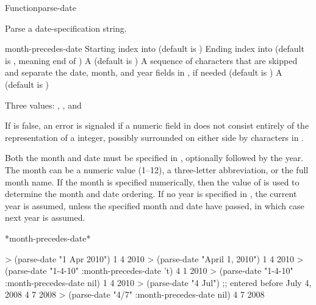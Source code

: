 \documentclass[10pt,twoside,english,pdftex]{article}
\begin{document}
\begin{functiondoc}{Function}{parse-date}{%
     
    \mbox{\returns{} }}
% 

\fnsyntax

\fnpurpose Parse a date-specification string.

\fnpackage {}

\fnmodule {}

\fnargs
\begin{args}{month-precedes-date}
\arg[start] Starting index into  (default is )
\arg[end] Ending index into  (default is \nil, meaning
end of )
 A  (default is \nil)
\arg[separators] A sequence of characters that are skipped and separate the
 date, month, and year fields in , if needed (default is 
 )
 A  (default is 
\textbf{})
\end{args}

\fnreturns Three values: , , and 

\fnerrors
%
If  is false, an error is signaled if a numeric field in
 does not consist entirely of the representation of a integer,
possibly surrounded on either side by characters in .

\fndescription
%
Both the month and date must be specified in ,
optionally followed by the year. The month can be a numeric value (1--12), a
three-letter abbreviation, or the full month name.  If the month is specified
numerically, then the value of  is used to
determine the month and date ordering. If no year is specified in
, the current year is assumed, unless the specified month and date
have passed, in which case next year is assumed.

\begin{alsos}{*month-precedes-date*}
\end{alsos}

\fnexamples
%
\W\supp
\begin{example}
> (parse-date "1 Apr 2010")
1
4
2010
> (parse-date "April 1, 2010")
1
4
2010\goodpagebreak
> (parse-date "1-4-10" :month-precedes-date 't)
4
1
2010
> (parse-date "1-4-10" :month-precedes-date nil)
1
4
2010\goodpagebreak
> (parse-date "4 Jul") \textcolor{darkergray}{;; entered before July 4, 2008}
4
7
2008
> (parse-date "4/7" :month-precedes-date nil)
4
7
2008
\end{example}

\end{functiondoc}
\end{document}
